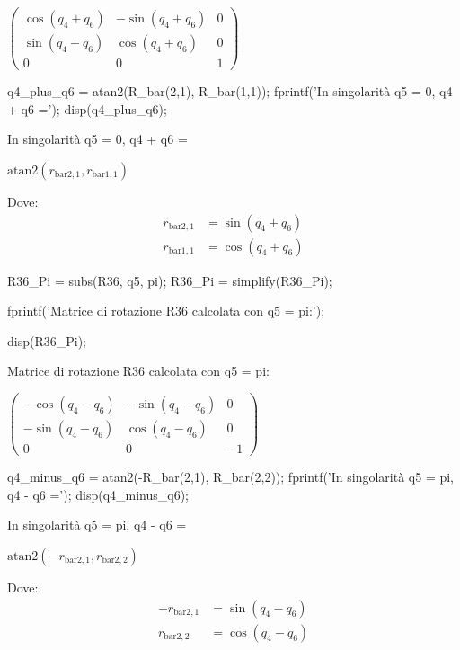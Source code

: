 \documentclass[11pt, a4paper]{article}
\begin{document}
\begin{matlabsymbolicoutput}
$\displaystyle \left(\begin{array}{ccc}
\cos \left(q_4 +q_6 \right) & -\sin \left(q_4 +q_6 \right) & 0\\
\sin \left(q_4 +q_6 \right) & \cos \left(q_4 +q_6 \right) & 0\\
0 & 0 & 1
\end{array}\right)$
\end{matlabsymbolicoutput}
\begin{matlabcode}
q4_plus_q6 = atan2(R_bar(2,1), R_bar(1,1));
fprintf('In singolarità q5 = 0, q4 + q6 =\n');
disp(q4_plus_q6);
\end{matlabcode}
\begin{matlaboutput}
In singolarità q5 = 0, q4 + q6 =
\end{matlaboutput}
\begin{matlabsymbolicoutput}
$\displaystyle \textrm{atan2}\left(r_{\textrm{bar2},1} ,r_{\textrm{bar1},1} \right)$
\end{matlabsymbolicoutput}
Dove:
\begin{align*}
    r_{\textrm{bar2},1} &= \sin(q_{4} + q_{6}) \\
    r_{\textrm{bar1},1} &= \cos(q_{4} + q_{6})
\end{align*}
\newpage
{}

\begin{matlabcode}
R36_Pi = subs(R36, q5, pi);
R36_Pi = simplify(R36_Pi);

fprintf('Matrice di rotazione R36 calcolata con q5 = pi:\n');

disp(R36_Pi);
\end{matlabcode}
\begin{matlaboutput}
Matrice di rotazione R36 calcolata con q5 = pi:
\end{matlaboutput}
\begin{matlabsymbolicoutput}
$\displaystyle \left(\begin{array}{ccc}
-\cos \left(q_4 -q_6 \right) & -\sin \left(q_4 -q_6 \right) & 0\\
-\sin \left(q_4 -q_6 \right) & \cos \left(q_4 -q_6 \right) & 0\\
0 & 0 & -1
\end{array}\right)$
\end{matlabsymbolicoutput}
\begin{matlabcode}
q4_minus_q6 = atan2(-R_bar(2,1), R_bar(2,2));
fprintf('In singolarità q5 = pi, q4 - q6 =\n');
disp(q4_minus_q6);
\end{matlabcode}
\begin{matlaboutput}
In singolarità q5 = pi, q4 - q6 =
\end{matlaboutput}
\begin{matlabsymbolicoutput}
$\displaystyle \textrm{atan2}\left(-r_{\textrm{bar2},1} ,r_{\textrm{bar2},2} \right)$
\end{matlabsymbolicoutput}
Dove:
\begin{align*}
    -r_{\textrm{bar2},1} &= \sin(q_{4} - q_{6}) \\
    r_{\textrm{bar2},2} &= \cos(q_{4} - q_{6})
\end{align*}
\end{document}
